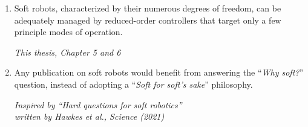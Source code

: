 \documentclass[a5paper]{article}
\begin{document}
\begin{enumerate}

  \item Soft robots, characterized by their numerous degrees of freedom, can be adequately managed by reduced-order controllers that target only a few principle modes of operation. %
  \begin{flushright}
  \vspace{-5mm}
  \textit{\small This thesis, Chapter 5 and 6}
  \vspace{-1mm}
  \end{flushright}

  \item Any publication on soft robots would benefit from answering the ``\textit{Why soft?}'' question, instead of adopting a ``\textit{Soft for soft's sake}'' philosophy. 
  \begin{flushright}
  \vspace{-2mm}
  \textit{Inspired by ``Hard questions for soft robotics'' \\ written by Hawkes et al., Science (2021)}
  \vspace{-1mm}
  \end{flushright}  


\end{enumerate}
\end{document}

